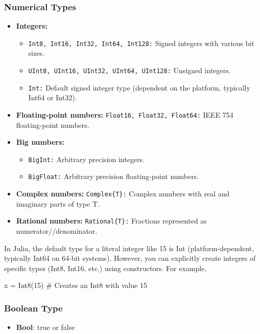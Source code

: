 \documentclass{report}
\begin{document}
    \subsubsection{Numerical Types}
    \begin{itemize}
        \item \textbf{Integers:}
            \begin{itemize}
                \item \texttt{Int8, Int16, Int32, Int64, Int128:} Signed integers with various bit sizes.
                \item \texttt{UInt8, UInt16, UInt32, UInt64, UInt128:} Unsigned integers.
                \item \texttt{Int:} Default signed integer type (dependent on the platform, typically Int64 or Int32).
            \end{itemize}
        \item \textbf{Floating-point numbers:} \texttt{Float16, Float32, Float64:} IEEE 754 floating-point numbers.
        \item \textbf{Big numbers:}
            \begin{itemize}
                \item \texttt{BigInt:} Arbitrary precision integers.
                \item \texttt{BigFloat:} Arbitrary precision floating-point numbers.
            \end{itemize}
        \item \textbf{Complex numbers:} \texttt{Complex\{T\}:} Complex numbers with real and imaginary parts of type T.
        \item \textbf{Rational numbers:} \texttt{Rational\{T\}:} Fractions represented as numerator//denominator.
    \end{itemize}
    \bigbreak \noindent 
    In Julia, the default type for a literal integer like 15 is Int (platform-dependent, typically Int64 on 64-bit systems). However, you can explicitly create integers of specific types (Int8, Int16, etc.) using constructors. For example,
    \bigbreak \noindent 
    \begin{jlcode}
     x = Int8(15)  # Creates an Int8 with value 15
    \end{jlcode}

    \bigbreak \noindent 
    \subsubsection{Boolean Type}
    \begin{itemize}
        \item \textbf{Bool}: true or false
    \end{itemize}
\end{document}
